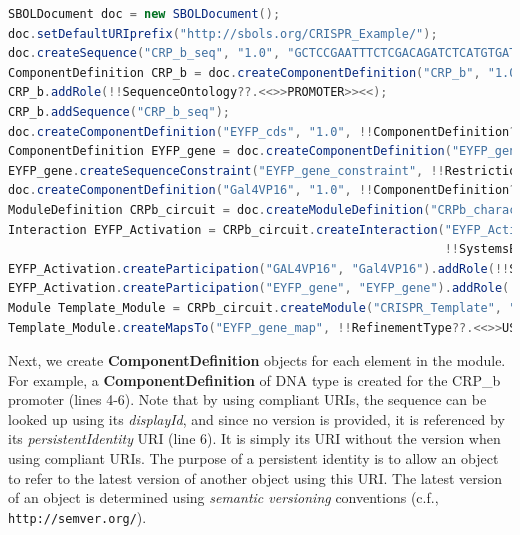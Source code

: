 \begin{program*}[ht]
\begin{lstlisting}[language=java,style=highlight]
SBOLDocument doc = new SBOLDocument();
doc.setDefaultURIprefix("http://sbols.org/CRISPR_Example/");
doc.createSequence("CRP_b_seq", "1.0", "GCTCCGAATTTCTCGACAGATCTCATGTGAT...", !!Sequence??.<<>>IUPAC_DNA>><<); 
ComponentDefinition CRP_b = doc.createComponentDefinition("CRP_b", "1.0", !!ComponentDefinition??.<<>>DNA>><<);
CRP_b.addRole(!!SequenceOntology??.<<>>PROMOTER>><<);
CRP_b.addSequence("CRP_b_seq");
doc.createComponentDefinition("EYFP_cds", "1.0", !!ComponentDefinition??.<<>>DNA>><<).addRole(!!SequenceOntology??.<<>>CDS>><<);
ComponentDefinition EYFP_gene = doc.createComponentDefinition("EYFP_gene", "1.0", !!ComponentDefinition??.<<>>DNA>><<);
EYFP_gene.createSequenceConstraint("EYFP_gene_constraint", !!RestrictionType??.<<>>PRECEDES>><<, "CRP_b", "EYFP_cds");
doc.createComponentDefinition("Gal4VP16", "1.0", !!ComponentDefinition??.<<>>PROTEIN>><<);
ModuleDefinition CRPb_circuit = doc.createModuleDefinition("CRPb_characterization_circuit", "1.0");
Interaction EYFP_Activation = CRPb_circuit.createInteraction("EYFP_Activation", 
                                                             !!SystemsBiologyOntology??.<<>>STIMULATION>><<);
EYFP_Activation.createParticipation("GAL4VP16", "Gal4VP16").addRole(!!SystemsBiologyOntology??.<<>>STIMULATOR>><<);
EYFP_Activation.createParticipation("EYFP_gene", "EYFP_gene").addRole(!!SystemsBiologyOntology??.<<>>PROMOTER>><<);
Module Template_Module = CRPb_circuit.createModule("CRISPR_Template", "CRISPR_Template", "1.0");
Template_Module.createMapsTo("EYFP_gene_map", !!RefinementType??.<<>>USELOCAL>><<, "EYFP_gene", "target_gene");
\end{lstlisting}
\caption{\label{JavaExample}Fragments of Java code to produce part of the CRISPR Repression example using {\tt libSBOLj 2.0}.}
\end{program*}

Next, we create \textbf{ComponentDefinition} objects for each element in the module. For example, a \textbf{ComponentDefinition} of DNA type is created for the CRP\_b promoter (lines 4-6).  Note that by using compliant URIs, the sequence can be looked up using its \emph{displayId}, and since no version is provided, it is referenced by its \emph{persistentIdentity} URI (line 6). It is simply its URI without the version when using compliant URIs. The purpose of a persistent identity is to allow an object to refer to the latest version of another object using this URI. The latest version of an object is determined using \emph{semantic versioning} conventions (c.f., {\tt http://semver.org/}).

